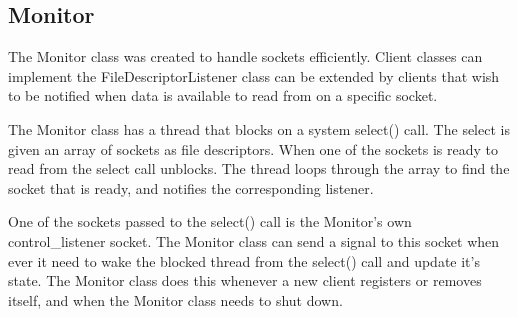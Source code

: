 \subsection{Monitor}

The Monitor class was created to handle sockets efficiently. Client classes can implement the FileDescriptorListener class can be extended by clients that wish to be notified when data is available to read from on a specific socket.

The Monitor class has a thread that blocks on a system select() call. The select is given an array of sockets as file descriptors. When one of the sockets is ready to read from the select call unblocks. The thread loops through the array to find the socket that is ready, and notifies the corresponding listener.

One of the sockets passed to the select() call is the Monitor's own control_listener socket. The Monitor class can send a signal to this socket when ever it need to wake the blocked thread from the select() call and update it's state. The Monitor class does this whenever a new client registers or removes itself, and when the Monitor class needs to shut down.